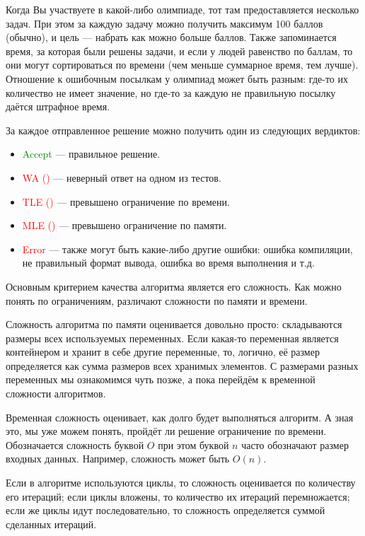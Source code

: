 Когда Вы участвуете в какой-либо олимпиаде, тот там предоставляется несколько задач. При этом за каждую задачу можно получить максимум 100 баллов (обычно), и цель — набрать как можно больше баллов. Также запоминается время, за которая были решены задачи, и если у людей равенство по баллам, то они могут сортироваться по времени (чем меньше суммарное время, тем лучше). Отношение к ошибочным посылкам у олимпиад может быть разным: где-то их количество не имеет значение, но где-то за каждую не правильную посылку даётся штрафное время.

За каждое отправленное решение можно получить один из следующих вердиктов:
\begin{itemize}
    \item \textcolor{green}{Accept} — правильное решение.
    \item \textcolor{red}{WA ()} — неверный ответ на одном из тестов.
    \item \textcolor{red}{TLE ()} — превышено ограничение по времени.
    \item \textcolor{red}{MLE ()} — превышено ограничение по памяти.
    \item \textcolor{red}{Error} — также могут быть какие-либо другие ошибки: ошибка компиляции, не правильный формат вывода, ошибка во время выполнения и т.д.
\end{itemize}

Основным критерием качества алгоритма является его сложность. Как можно понять по ограничениям, различают сложности по памяти и времени.

Сложность алгоритма по памяти оценивается довольно просто: складываются размеры всех используемых переменных. Если какая-то переменная является контейнером и хранит в себе другие переменные, то, логично, её размер определяется как сумма размеров всех хранимых элементов. С размерами разных переменных мы ознакомимся чуть позже, а пока перейдём к временной сложности алгоритмов.

Временная сложность оценивает, как долго будет выполняться алгоритм. А зная это, мы уже можем понять, пройдёт ли решение ограничение по времени. Обозначается сложность буквой $O$ при этом буквой $n$ часто обозначают размер входных данных. Например, сложность может быть $O(n)$.

Если в алгоритме используются циклы, то сложность оценивается по количеству его итераций; если циклы вложены, то количество их итераций перемножается; если же циклы идут последовательно, то сложность определяется суммой сделанных итераций.

